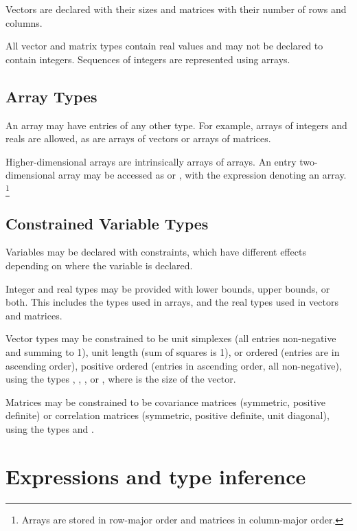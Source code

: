 \documentclass[article]{jss}
\begin{document}
Vectors are declared with their sizes and matrices with their number
of rows and columns.

All vector and matrix types contain real values and may not be
declared to contain integers.  Sequences of integers are represented
using arrays.

\subsection{Array Types}

An array may have entries of any other type.  For example, arrays of
integers and reals are allowed, as are arrays of vectors or arrays of
matrices.  

Higher-dimensional arrays are intrinsically arrays of arrays.  An
entry two-dimensional array  may be accessed as 
or , with the expression  denoting an array.%
%
\footnote{ Arrays are stored in row-major order and matrices in
  column-major order.}

\subsection{Constrained Variable Types}

Variables may be declared with constraints, which have different
effects depending on where the variable is declared.

Integer and real types may be provided with lower bounds, upper
bounds, or both.  This includes the types used in arrays, and the real
types used in vectors and matrices.

Vector types may be constrained to be unit simplexes (all entries
non-negative and summing to 1), unit length (sum of squares is 1), or
ordered (entries are in ascending order), positive ordered (entries in
ascending order, all non-negative), using the types ,
, , or
, where  is the size of the vector.

Matrices may be constrained to be covariance matrices (symmetric,
positive definite) or correlation matrices (symmetric, positive
definite, unit diagonal), using the types  and
.

\section{Expressions and type inference}
\end{document}
